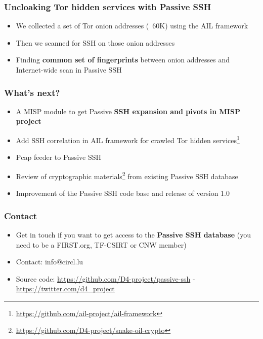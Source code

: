 \documentclass{beamer}
\begin{document}
\begin{frame}
        \frametitle{Uncloaking Tor hidden services with Passive SSH}
        \begin{itemize}
                \item We collected a set of Tor onion addresses (~60K) using the AIL framework
                \item Then we scanned for SSH on those onion addresses
                \item Finding {\bf common set of fingerprints} between onion addresses and Internet-wide scan in Passive SSH
        \end{itemize}
\end{frame}

\begin{frame}
        \frametitle{What's next?}
        \begin{itemize}
               \item A MISP module to get Passive {\bf SSH expansion and pivots in MISP project}
               \item Add SSH correlation in AIL framework for crawled Tor hidden services\footnote{\url{https://github.com/ail-project/ail-framework}}
               \item Pcap feeder to Passive SSH
               \item Review of cryptographic materials\footnote{\url{https://github.com/D4-project/snake-oil-crypto}} from existing Passive SSH database
               \item Improvement of the Passive SSH code base and release of version 1.0
        \end{itemize}
\end{frame}

\begin{frame}
\frametitle{Contact}
\begin{itemize}
        \item Get in touch if you want to get access to the {\bf Passive SSH database} (you need to be a FIRST.org, TF-CSIRT or CNW member)
\item Contact: info@circl.lu
\item Source code: \url{https://github.com/D4-project/passive-ssh} -  \url{https://twitter.com/d4_project}
\end{itemize}
\end{frame}
\end{document}
